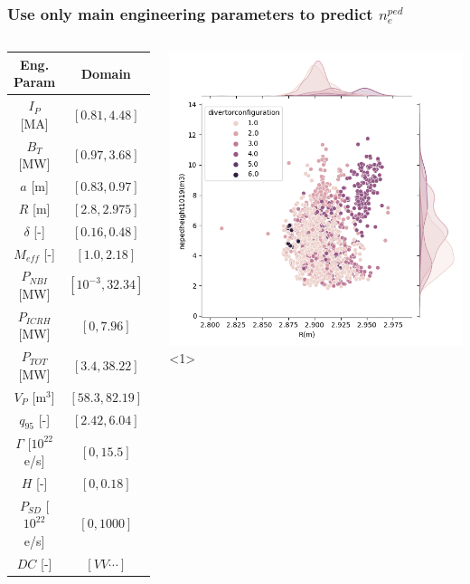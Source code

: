 \documentclass{beamer}
\begin{document}
\begin{frame}
\frametitle{Use only main engineering parameters to predict $n_e^{ped}$}
\begin{columns}


\begin{center}
\begin{tabular}{| c | c | }
	\hline
	Eng. Param & Domain \\
	\hline
	$I_P$ [MA] & $[0.81, 4.48]$ \\
	$B_T$ [MW] & $[0.97, 3.68]$ \\
	$a$ [m] & $[0.83, 0.97]$ \\
	$R$ [m] & $[2.8, 2.975]$ \\ 
	$\delta$ [-] & $[0.16, 0.48]$ \\
	$M_{eff}$ [-] & $[1.0, 2.18]$ \\
	$P_{NBI}$ [MW] & $[10^{-3}, 32.34]$ \\
	$P_{ICRH}$ [MW] & $[0, 7.96]$ \\
	$P_{TOT}$ [MW] & $[3.4, 38.22]$ \\
	$V_P$ [m$^3$] &  $[58.3, 82.19]$ \\
	$q_{95}$ [-] & $[2.42, 6.04]$ \\
	$\Gamma$ [$10^{22}$ e/s] & $[0, 15.5]$ \\
	$H$ [-] & $[0, 0.18]$ \\
	$P_{SD}$ [$10^{22}$ e/s] & $[0, 1000]$ \\
	$DC$ [-] & $[VV \cdots]$ \\
	\hline
\end{tabular}
	\end{center}
	\hfill
{}
\begin{center}
\includegraphics[scale=0.48]{./src/R_vs_NEPED_DC}<1>
\end{center}

\end{columns}
\end{frame}
\end{document}
